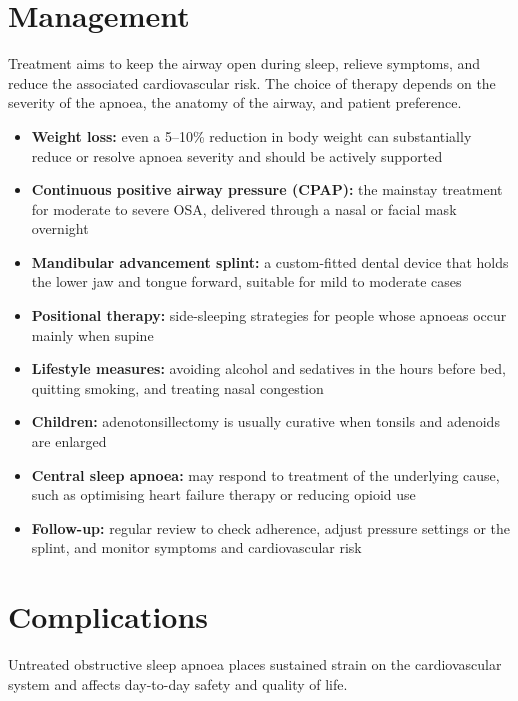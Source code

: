 \section*{Management}
Treatment aims to keep the airway open during sleep, relieve symptoms, and reduce the associated cardiovascular risk. The choice of therapy depends on the severity of the apnoea, the anatomy of the airway, and patient preference.

\begin{itemize}
    \item \textbf{Weight loss:} even a 5--10\% reduction in body weight can substantially reduce or resolve apnoea severity and should be actively supported
    \item \textbf{Continuous positive airway pressure (CPAP):} the mainstay treatment for moderate to severe OSA, delivered through a nasal or facial mask overnight
    \item \textbf{Mandibular advancement splint:} a custom-fitted dental device that holds the lower jaw and tongue forward, suitable for mild to moderate cases
    \item \textbf{Positional therapy:} side-sleeping strategies for people whose apnoeas occur mainly when supine
    \item \textbf{Lifestyle measures:} avoiding alcohol and sedatives in the hours before bed, quitting smoking, and treating nasal congestion
    \item \textbf{Children:} adenotonsillectomy is usually curative when tonsils and adenoids are enlarged
    \item \textbf{Central sleep apnoea:} may respond to treatment of the underlying cause, such as optimising heart failure therapy or reducing opioid use
    \item \textbf{Follow-up:} regular review to check adherence, adjust pressure settings or the splint, and monitor symptoms and cardiovascular risk
\end{itemize}

\section*{Complications}
Untreated obstructive sleep apnoea places sustained strain on the cardiovascular system and affects day-to-day safety and quality of life.

